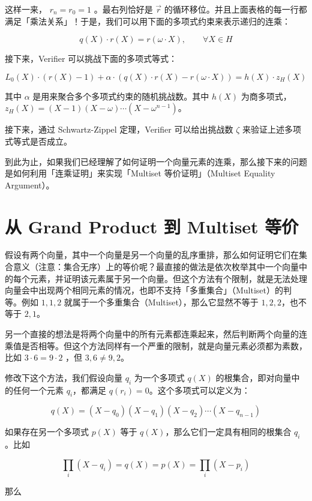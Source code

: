 这样一来， \(r_n=r_0=1\) 。最右列恰好是 \(\vec{r}\)
的循环移位。并且上面表格的每一行都满足「乘法关系」！于是，我们可以用下面的多项式约束来表示递归的连乘：

\[
q(X)\cdot r(X)=r(\omega\cdot X), \qquad \forall X\in H
\]

接下来，Verifier 可以挑战下面的多项式等式：

\[
L_0(X)\cdot(r(X)-1)+\alpha\cdot(q(X)\cdot r(X)-r(\omega\cdot X))=h(X)\cdot z_H(X)
\]

其中 \(\alpha\) 是用来聚合多个多项式约束的随机挑战数。其中 \(h(X)\)
为商多项式， \(z_H(X)=(X-1)(X-\omega)\cdots(X-\omega^{n-1})\)。

接下来，通过 Schwartz-Zippel 定理，Verifier 可以给出挑战数 \(\zeta\)
来验证上述多项式等式是否成立。

到此为止，如果我们已经理解了如何证明一个向量元素的连乘，那么接下来的问题是如何利用「连乘证明」来实现「Multiset
等价证明」（Multiset Equality Argument）。

\hypertarget{ux4ece-grand-product-ux5230-multiset-ux7b49ux4ef7}{%
\section{从 Grand Product 到 Multiset
等价}\label{ux4ece-grand-product-ux5230-multiset-ux7b49ux4ef7}}

假设有两个向量，其中一个向量是另一个向量的乱序重排，那么如何证明它们在集合意义（注意：集合无序）上的等价呢？最直接的做法是依次枚举其中一个向量中的每个元素，并证明该元素属于另一个向量。但这个方法有个限制，就是无法处理向量会中出现两个相同元素的情况，也即不支持「多重集合」（Multiset）的判等。例如
\({1,1,2}\) 就属于一个多重集合（Multiset），那么它显然不等于
\({1, 2, 2}\)，也不等于 \({2,1}\)。

另一个直接的想法是将两个向量中的所有元素都连乘起来，然后判断两个向量的连乘值是否相等。但这个方法同样有一个严重的限制，就是向量元素必须都为素数，比如
\(3\cdot6=9\cdot2\) ，但 \({3,6}\neq{9,2}\)。

修改下这个方法，我们假设向量 \({q_i}\) 为一个多项式 \(q(X)\)
的根集合，即对向量中的任何一个元素 \(q_i\)，都满足
\(q(r_i)=0\)。这个多项式可以定义为：

\[
q(X) = (X-q_0)(X-q_1)(X-q_2)\cdots (X-q_{n-1})
\]

如果存在另一个多项式 \(p(X)\) 等于
\(q(X)\)，那么它们一定具有相同的根集合 \({q_i}\)。比如

\[
\prod_{i}(X - q_i) = q(X) = p(X) = \prod_{i}(X - p_i)
\]

那么

